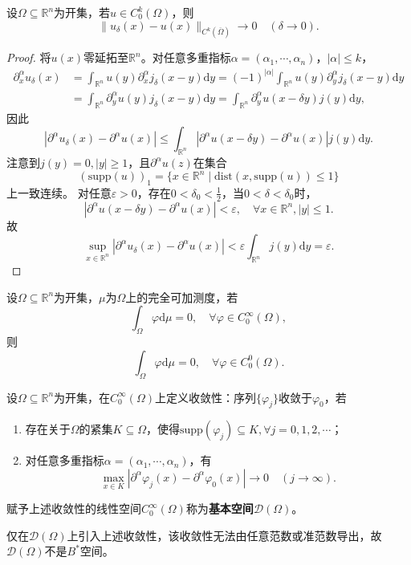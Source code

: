 \documentclass[../../main.tex]{subfiles}%
\begin{document}
\begin{theorem}\label{theorem:磨光逼近定理}
设$\Omega\subseteq\mathbb{R}^n$为开集，若$u\in C_0^k(\Omega)$，则
$$\|u_\delta(x)-u(x)\|_{C^k(\overline{\Omega})}\to0\quad(\delta\to0).$$
\end{theorem}
\begin{proof}

将$u(x)$零延拓至$\mathbb{R}^n$。对任意多重指标$\alpha=(\alpha_1,\cdots,\alpha_n)$，$|\alpha|\leqslant k$，
\begin{align*}
\partial_x^\alpha u_\delta(x)&=\int_{\mathbb{R}^n}u(y)\partial_x^\alpha j_\delta(x-y)\mathrm{d}y
=(-1)^{|\alpha|}\int_{\mathbb{R}^n}u(y)\partial_y^\alpha j_\delta(x-y)\mathrm{d}y\\
&=\int_{\mathbb{R}^n}\partial_y^\alpha u(y)j_\delta(x-y)\mathrm{d}y=\int_{\mathbb{R}^n}\partial_y^\alpha u(x-\delta y)j(y)\mathrm{d}y,
\end{align*}
因此
$$|\partial^\alpha u_\delta(x)-\partial^\alpha u(x)|\leqslant\int_{\mathbb{R}^n}|\partial^\alpha u(x-\delta y)-\partial^\alpha u(x)|j(y)\mathrm{d}y.$$
注意到$j(y)=0,|y|\geqslant1$，且$\partial^\alpha u(z)$在集合
$$(\mathrm{supp}(u))_1=\{x\in\mathbb{R}^n\mid\mathrm{dist}(x,\mathrm{supp}(u))\leqslant1\}$$
上一致连续。
对任意$\varepsilon>0$，存在$0<\delta_0<\frac{1}{2}$，当$0<\delta<\delta_0$时，
$$|\partial^\alpha u(x-\delta y)-\partial^\alpha u(x)|<\varepsilon,\quad\forall x\in\mathbb{R}^n,|y|\leqslant1.$$
故
$$\sup\limits_{x\in\mathbb{R}^n}|\partial^\alpha u_\delta(x)-\partial^\alpha u(x)|<\varepsilon\int_{\mathbb{R}^n}j(y)\mathrm{d}y=\varepsilon.
$$
\end{proof}

\begin{corollary}
设$\Omega\subseteq\mathbb{R}^n$为开集，$\mu$为$\Omega$上的完全可加测度，若
$$\int_{\Omega}\varphi\mathrm{d}\mu=0,\quad\forall\varphi\in C_0^\infty(\Omega),$$
则
$$\int_{\Omega}\varphi\mathrm{d}\mu=0,\quad\forall\varphi\in C_0^0(\Omega).$$
\end{corollary}

\begin{definition}
设$\Omega\subseteq\mathbb{R}^n$为开集，在$C_0^\infty(\Omega)$上定义收敛性：序列$\{\varphi_j\}$收敛于$\varphi_0$，若
\begin{enumerate}[(1)]
\item 存在关于$\Omega$的紧集$K\subseteq\Omega$，使得$\mathrm{supp}(\varphi_j)\subseteq K,\forall j=0,1,2,\cdots$；
\item 对任意多重指标$\alpha=(\alpha_1,\cdots,\alpha_n)$，有
$$\max\limits_{x\in K}|\partial^\alpha\varphi_j(x)-\partial^\alpha\varphi_0(x)|\to0\quad(j\to\infty).$$
\end{enumerate}
赋予上述收敛性的线性空间$C_0^\infty(\Omega)$称为\textbf{基本空间}$\mathscr{D}(\Omega)$。
\end{definition}
\begin{remark}
仅在$\mathscr{D}(\Omega)$上引入上述收敛性，该收敛性无法由任意范数或准范数导出，故$\mathscr{D}(\Omega)$不是$B^*$空间。
\end{remark}
\end{document}
